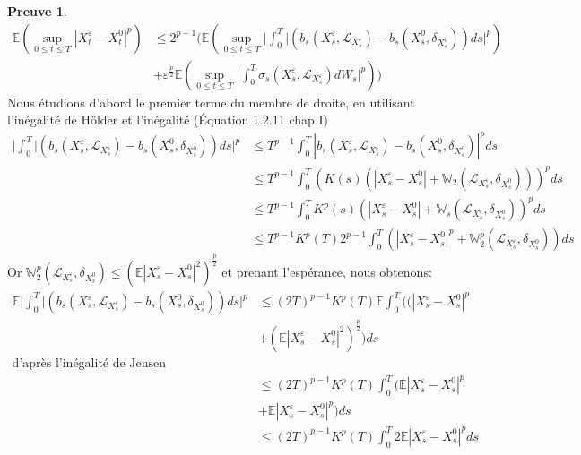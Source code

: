 \documentclass[12pt,a4paper,twoside,fleqn]{book}%
\theoremstyle{definition}
\newtheorem*{pr}{\textbf{Preuve}}
\theoremstyle{lemme}
\numberwithin{equation}{section}
\begin{document}
\begin{pr}
\begin{equation}
	\begin{aligned}
		\mathbb{E}\left(\sup_{0\leq t \leq T} |X_t^\varepsilon - X_t^0|^p\right) &\leq 2^{p-1}\Big( \mathbb{E}\left(\sup_{0\leq t \leq T}\Big|\int_{0}^{T}\Big|\left(b_s(X_s^\varepsilon,\mathcal{L}_{X_s^\varepsilon}) - b_s(X_s^0,\delta_{X_s^0})\right)ds\Big|^p\right)\\&+\varepsilon^{\frac{p}{2}}\mathbb{E}\left(\sup_{0\leq t \leq T}\Big|\int_{0}^{T}\sigma_s(X_s^\varepsilon,\mathcal{L}_{X_s^\varepsilon})dW_s\Big|^p\right) \Big)
	\end{aligned}
\end{equation}
Nous étudions d’abord le premier terme du membre de droite, en utilisant l'inégalité de Hölder et l'inégalité (Équation 1.2.11 chap I)
\[
\begin{aligned}
\Big|\int_{0}^{T}\Big|\left(b_s(X_s^\varepsilon,\mathcal{L}_{X_s^\varepsilon}) - b_s(X_s^0,\delta_{X_s^0})\right)ds\Big|^p&\leq T^{p-1}\int_{0}^{T}\left| b_s(X_s^\varepsilon,\mathcal{L}_{X_s^\varepsilon})-b_s(X_s^0,\delta_{X_s^0})\right|^pds\\
&\leq T^{p-1}\int_{0}^{T}\left(K(s)(|X_s^\varepsilon-X_s^0| + \mathbb{W}_2(\mathcal{L}_{X_s^\varepsilon},\delta_{X_s^0}))\right)^pds\\
&\leq T^{p-1}\int_{0}^{T}K^p(s)(|X_s^\varepsilon-X_s^0|+ \mathbb{W}_s(\mathcal{L}_{X_s^\varepsilon}, \delta_{X_s^0}))^p ds\\
&\leq T^{p-1}K^p(T)2^{p-1}\int_{0}^{T}\left(|X_s^\varepsilon-X_s^0|^p + \mathbb{W}_2^p(\mathcal{L}_{X_s^\varepsilon},\delta_{X_s^0})\right)ds
\end{aligned}
\]
Or $\mathbb{W}_2^p(\mathcal{L}_{X_s^\varepsilon},\delta_{X_s^0})\leq \left(\mathbb{E}|X_s^\varepsilon-X_s^0|^2\right)^{\frac{p}{2}}$ et prenant l'espérance, nous obtenons:
\[
\begin{aligned}
\mathbb{E}\Big|\int_{0}^{T}\Big|\left(b_s(X_s^\varepsilon,\mathcal{L}_{X_s^\varepsilon}) - b_s(X_s^0,\delta_{X_s^0})\right)ds\Big|^p&\leq (2T)^{p-1}K^p(T)\mathbb{E}\int_{0}^{T}\Big((|X_s^\varepsilon-X_s^0|^p\\ &+\left(\mathbb{E}|X_s^\varepsilon-X_s^0|^2\right)^{\frac{p}{2}}\Big)ds\\
\text{d'après l'inégalité de Jensen}\\
&\leq (2T)^{p-1}K^p(T)\int_{0}^{T}\Big(\mathbb{E}|X_s^\varepsilon-X_s^0|^p\\ &+\mathbb{E}|X_s^\varepsilon-X_s^0|^p\Big)ds\\
&\leq (2T)^{p-1}K^p(T)\int_{0}^{T}2\mathbb{E}|X_s^\varepsilon-X_s^0|^pds\\

\end{aligned}\]
\end{pr}
\end{document}
